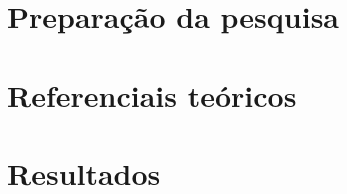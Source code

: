 \documentclass[
	12pt,						%
	openright,					%
	oneside,					%
	a4paper,					%
	english,					%
	french,						%
	spanish,					%
	brazil						%
	]{abntex2}
\begin{document}

\frenchspacing 


\imprimircapa

\imprimirfolhaderosto*	%










%
%
%

\tableofcontents*
\cleardoublepage%

\textual%



\part{Preparação da pesquisa}


\part{Referenciais teóricos}


\part{Resultados}


\end{document}
